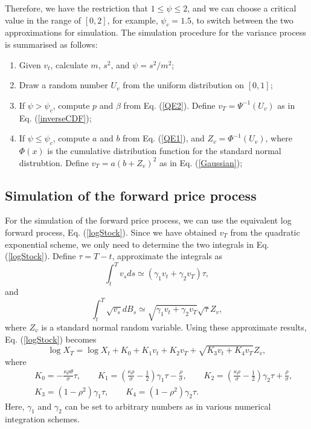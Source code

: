 \documentclass[12pt]{article}
\begin{document}
    Therefore, we have the restriction that $1 \le \psi \le 2$, and we can choose a critical value in the range of $[0,2]$,
    for example, $\psi_c=1.5$, to switch between the two approximations for simulation. The simulation procedure for the variance
    process is summarised as follows:
    \begin{enumerate}[noitemsep]
      \item Given $v_t$, calculate $m$, $s^2$, and $\psi=s^2/m^2$;
      \item Draw a random number $U_v$ from the uniform distribution on $[0,1]$;
      \item If $\psi > \psi_c$, compute $p$ and $\beta$ from Eq. (\ref{QE2}). Define $v_T=\Psi^{-1}(U_v)$ as in Eq. (\ref{inverseCDF});
      \item If $\psi \le \psi_c$, compute $a$ and $b$ from Eq. (\ref{QE1}), and $Z_v=\Phi^{-1}(U_v)$, where $\Phi(x)$ is the cumulative distribution
            function for the standard normal distrubtion. Define $v_T=a\left(b+Z_v\right)^2$ as in Eq. (\ref{Gaussian});
    \end{enumerate}

  \subsection{Simulation of the forward price process}

    For the simulation of the forward price process, we can use the equivalent log forward process, Eq. (\ref{logStock}). Since we have
    obtained $v_T$ from the quadratic exponential scheme, we only need to determine the two integrals in Eq. (\ref{logStock}). Define
    $\tau=T-t$, approximate the integrals as
    \begin{equation}
      \int_t^Tv_sds\simeq\left(\gamma_1v_t+\gamma_2v_T\right)\tau,
    \end{equation}
    and
    \begin{equation}
      \int_t^T\sqrt{v_s}dB_s\simeq\sqrt{\gamma_1v_t+\gamma_2v_T}\sqrt{\tau}Z_v,
    \end{equation}
    where $Z_v$ is a standard normal random variable. Using these approximate results, Eq. (\ref{logStock}) becomes
    \begin{equation}
      \log X_T = \log X_t + K_0 + K_1v_t + K_2v_T + \sqrt{K_3v_t + K_4v_T}Z_v,
      \label{logStock2}
    \end{equation}
    where
    \begin{eqnarray}
      && K_0 = -\frac{\kappa\rho\theta}{\sigma}\tau,\quad\quad
         K_1 = \left(\frac{\kappa\rho}{\sigma}-\frac{1}{2}\right)\gamma_1\tau-\frac{\rho}{\sigma}, \quad\quad
         K_2 = \left(\frac{\kappa\rho}{\sigma}-\frac{1}{2}\right)\gamma_2\tau+\frac{\rho}{\sigma}, \nonumber\\
      && K_3 = (1-\rho^2)\gamma_1\tau, \quad\quad
         K_4 = (1-\rho^2)\gamma_2\tau.
    \end{eqnarray}
    Here, $\gamma_1$ and $\gamma_2$ can be set to arbitrary numbers as in various numerical integration schemes.
\end{document}

